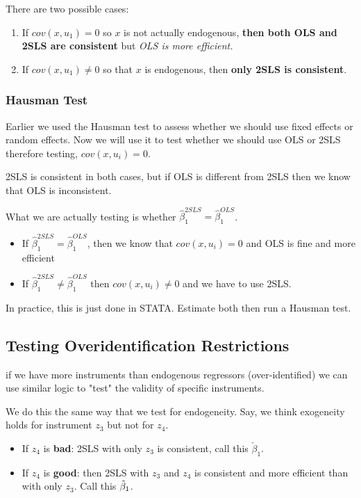 \documentclass[11pt]{article}
\begin{document}
There are two possible cases:
\begin{enumerate}
    \item If $cov(x,u_1) = 0$ so $x$ is not actually endogenous, \textbf{then both OLS and 2SLS are consistent} but \textit{OLS is more efficient.}
    \item If $cov(x,u_1) \neq0$ so that $x$ is endogenous, then \textbf{only 2SLS is consistent}.
\end{enumerate}

\subsubsection{Hausman Test}

Earlier we used the Hausman test to assess whether we should use fixed effects or random effects. Now we will use it to test whether we should use OLS or 2SLS therefore testing, $cov(x,u_i) = 0$.

2SLS is consistent in both cases, but if OLS is different from 2SLS then we know that OLS is inconsistent.

\begin{procedure}
    What we are actually testing is whether $\hat{\beta}_1^{2SLS} = \hat{\beta}_1^{OLS}$.

    \begin{itemize}
        \item If $\hat{\beta}_1^{2SLS} = \hat{\beta}_1^{OLS}$, then we know that $cov(x,u_i) = 0$ and OLS is fine and more efficient
        \item If $\hat{\beta}_1^{2SLS} \neq \hat{\beta}_1^{OLS}$ then $cov(x,u_i)\neq0$ and we have to use 2SLS.
    \end{itemize}
    In practice, this is just done in STATA. Estimate both then run a Hausman test.
\end{procedure}

\subsection{Testing Overidentification Restrictions}

if we have more instruments than endogenous regressors (over-identified) we can use similar logic to "test" the validity of specific instruments.

We do this the same way that we test for endogeneity. Say, we think exogeneity holds for instrument $z_3$ but not for $z_4$.
\begin{itemize}
    \item If $z_4$ is \textbf{bad}: 2SLS with only $z_3$ is consistent, call this $\check{\beta}_1$.
    \item If $z_4$ is \textbf{good}: then 2SLS with $z_3$ and $z_4$ is consistent and more efficient than with only $z_3$. Call this $\Tilde{\beta}_1$.
\end{itemize}
\end{document}
